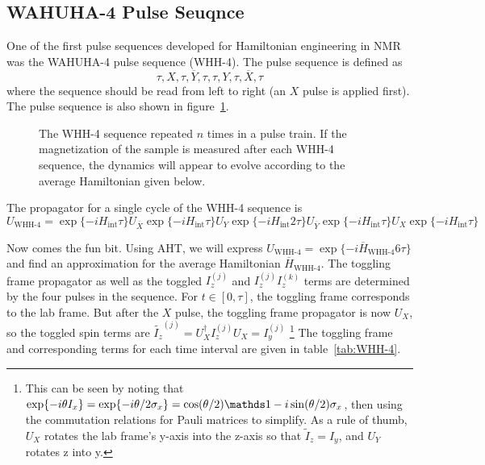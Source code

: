 \subsection{WAHUHA-4 Pulse Seuqnce}\label{subsec:WHH-4}

One of the first pulse sequences developed for Hamiltonian engineering in NMR was the WAHUHA-4 pulse sequence (WHH-4).\cite{PhysRevLett.20.180} The pulse sequence is defined as
\begin{equation}
    \tau, X, \tau, \overline{Y}, \tau, \tau, Y, \tau, \overline{X}, \tau
\end{equation}
where the sequence should be read from left to right (an $X$ pulse is applied first). The pulse sequence is also shown in figure~\ref{fig:WHH-4}.

\begin{figure}[H]
    \centering
    
    \caption{The WHH-4 sequence repeated $n$ times in a pulse train. If the magnetization of the sample is measured after each WHH-4 sequence, the dynamics will appear to evolve according to the average Hamiltonian given below.}
    \label{fig:WHH-4}
\end{figure}

The propagator for a single cycle of the WHH-4 sequence is
\[
U_{\text{WHH-4}} =
    \exp\{-i H_{\text{int}} \tau\} U_{\overline{X}}
    \exp\{-i H_{\text{int}} \tau\} U_Y
    \exp\{-i H_{\text{int}} 2\tau\} U_{\overline{Y}}
    \exp\{-i H_{\text{int}} \tau\} U_X
    \exp\{-i H_{\text{int}} \tau\}
\]

Now comes the fun bit. Using AHT, we will express $U_{\text{WHH-4}} = \exp\{-i \overline{H}_{\text{WHH-4}} 6\tau\}$ and find an approximation for the average Hamiltonian $\overline{H}_{\text{WHH-4}}$. The toggling frame propagator as well as the toggled $I_z^{(j)}$ and $I_z^{(j)}I_z^{(k)}$ terms are determined by the four pulses in the sequence. For $t \in [0, \tau]$, the toggling frame corresponds to the lab frame.
But after the $X$ pulse, the toggling frame propagator is now $U_X$, so the toggled spin terms are $\widetilde{I_z}^{(j)} = U_X^\dagger I_z^{(j)} U_X = I_y^{(j)}$
\footnote{
This can be seen by noting that $\exp\{-i \theta I_x\} = \exp\{-i \theta/2 \sigma_x\} = \cos(\theta/2) \identity - i\sin(\theta/2) \sigma_x$, then using the commutation relations for Pauli matrices to simplify. As a rule of thumb, $U_X$ rotates the lab frame's y-axis into the z-axis so that $\widetilde{I}_z = I_y$, and $U_Y$ rotates z into y.
}
The toggling frame and corresponding terms for each time interval are given in table~\ref{tab:WHH-4}.

